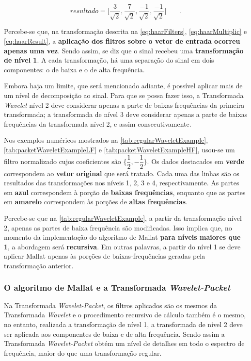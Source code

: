 			\begin{equation}
				resultado = \Big[
				\frac{3}{\sqrt{2}},
				\frac{7}{\sqrt{2}},
				\frac{-1}{\sqrt{2}},
				\frac{-1}{\sqrt{2}}
				\Big]\qquad.
				\label{eq:haarResult}
			\end{equation}
			
			\par Percebe-se que, na transformação descrita na \autoref{eq:haarFilters}, \autoref{eq:haarMultiplic} e \autoref{eq:haarResult}, a \textbf{aplicação dos filtros sobre o vetor de entrada ocorreu apenas uma vez}. Sendo assim, se diz que o sinal recebeu uma \textbf{transformação de nível 1}. A cada transformação, há uma separação do sinal em dois componentes: o de baixa e o de alta frequência.
	
			\par Embora haja um limite, que será mencionado adiante, é possível aplicar mais de um nível de decomposição ao sinal. Para que se possa fazer isso, a Transformada \textit{Wavelet} nível 2 deve considerar apenas a parte de baixas frequências da primeira transformada; a transformada de nível 3 deve considerar apenas a parte de baixas frequências da transformada nível 2, e assim consecutivamente.
			
			\par Nos exemplos numéricos mostrados na \autoref{tab:regularWaveletExample}, \autoref{tab:packetWaveletExampleLF} e \autoref{tab:packetWaveletExampleHF}, usou-se um filtro normalizado cujos coeficientes são $\{\dfrac{1}{2},-\dfrac{1}{2}\}$. Os dados destacados em \textbf{verde} correspondem ao \textbf{vetor original} que será tratado. Cada uma das linhas são os resultados das transformações nos níveis 1, 2, 3 e 4, respectivamente. As partes em \textbf{azul} correspondem à porção de \textbf{baixas frequências}, enquanto que as partes em \textbf{amarelo} correspondem às porções de \textbf{altas frequências}.
			
			\par Percebe-se que na \autoref{tab:regularWaveletExample}, a partir da transformação nível 2, apenas as partes de baixa frequência são modificadas. Isso implica que, no momento da implementação do algoritmo de Mallat \textbf{para níveis maiores que 1}, a abordagem será \textbf{recursiva}. Em outras palavras, a partir do nível 1 se deve aplicar Mallat apenas às porções de baixas-frequências geradas pela transformação anterior.
	
			
	
		\subsubsection{O algoritmo de Mallat e a Transformada \textit{Wavelet-Packet}}
			\par Na Transformada \textit{Wavelet-Packet}, os filtros aplicados são os mesmos da Transformada \textit{Wavelet} e o procedimento recursivo de cálculo também é o mesmo, no entanto, realizada a transformação de nível 1, a transformada de nível 2 deve ser aplicada aos componentes de baixa e de alta frequência. Sendo assim a Transformada \textit{Wavelet-Packet} obtém um nível de detalhes em todo o espectro de frequência, maior do que uma transformação regular. 
			
